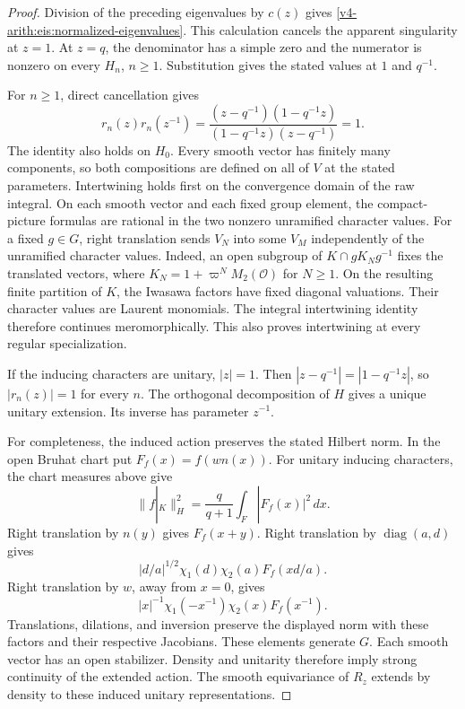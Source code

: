 \begin{proof}
Division of the preceding eigenvalues by $c(z)$ gives
\eqref{v4-arith:eis:normalized-eigenvalues}.
This calculation cancels the apparent singularity at $z=1$.
At $z=q$, the denominator has a simple zero and the numerator is nonzero
on every $H_n$, $n\ge1$.
Substitution gives the stated values at $1$ and $q^{-1}$.

For $n\ge1$, direct cancellation gives
\[
 r_n(z)r_n(z^{-1})
 =\frac{(z-q^{-1})(1-q^{-1}z)}
 {(1-q^{-1}z)(z-q^{-1})}=1.
\]
The identity also holds on $H_0$.
Every smooth vector has finitely many components, so both compositions
are defined on all of $V$ at the stated parameters.
Intertwining holds first on the convergence domain of the raw integral.
On each smooth vector and each fixed group element, the compact-picture
formulas are rational in the two nonzero unramified character values.
For a fixed $g\in G$, right translation sends $V_N$ into some $V_M$
independently of the unramified character values.
Indeed, an open subgroup of $K\cap gK_Ng^{-1}$ fixes the translated
vectors, where $K_N=1+\varpi^NM_2(\mathcal O)$ for $N\ge1$.
On the resulting finite partition of $K$, the Iwasawa factors have
fixed diagonal valuations. Their character values are Laurent monomials.
The integral intertwining identity therefore continues meromorphically.
This also proves intertwining at every regular specialization.

If the inducing characters are unitary, $|z|=1$.
Then $|z-q^{-1}|=|1-q^{-1}z|$, so $|r_n(z)|=1$ for every $n$.
The orthogonal decomposition of $H$ gives a unique unitary extension.
Its inverse has parameter $z^{-1}$.

For completeness, the induced action preserves the stated Hilbert norm.
In the open Bruhat chart put $F_f(x)=f(wn(x))$.
For unitary inducing characters, the chart measures above give
\[
 \|f|_K\|_H^2=\frac{q}{q+1}\int_F|F_f(x)|^2\,dx.
\]
Right translation by $n(y)$ gives $F_f(x+y)$.
Right translation by $\operatorname{diag}(a,d)$ gives
\[
 |d/a|^{1/2}\chi_1(d)\chi_2(a)F_f(xd/a).
\]
Right translation by $w$, away from $x=0$, gives
\[
 |x|^{-1}\chi_1(-x^{-1})\chi_2(x)F_f(x^{-1}).
\]
Translations, dilations, and inversion preserve the displayed norm
with these factors and their respective Jacobians.
These elements generate $G$.
Each smooth vector has an open stabilizer. Density and unitarity
therefore imply strong continuity of the extended action.
The smooth equivariance of $R_z$ extends by density to these
induced unitary representations.
\end{proof}

